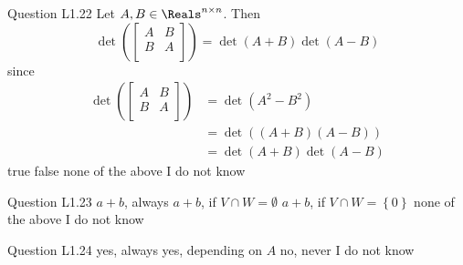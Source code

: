 \begin{frame}{Question L1.22}
	\QuestionNotes{}
	\QuestionBody
	{
		Let $A, B \in \Reals^{n \times n}$. Then
		$$
		\det
		\left( 
			\begin{bmatrix}
				A & B \\
				B & A \\
			\end{bmatrix}
		\right)
		=
		\det \left( A + B \right)
		\det \left( A - B \right)
		$$
		since
		$$
		\begin{array}{ll}
			\det
			\left( 
				\begin{bmatrix}
					A & B \\
					B & A \\
				\end{bmatrix}
			\right)
			& =
			\det
			\left( 
				A^{2} - B^{2}
			\right) \\
			& =
			\det
			\left( 
				(A + B)
				(A - B)
			\right) \\
			& =
			\det \left( A + B \right)
			\det \left( A - B \right)
		\end{array}
		$$
	}
	\QuestionAnswers
	{
		\answer true
		\answer false
		\correctanswer none of the above
		\answer I do not know
	}
\end{frame}


\begin{frame}{Question L1.23}
	\QuestionNotes{}
	\QuestionAnswers
	{
		\answer $a + b$, always
		\answer $a + b$, if $V \cap W = \emptyset$
		\correctanswer $a + b$, if $V \cap W = \left\{ 0 \right\}$
		\answer none of the above
		\answer I do not know
	}
\end{frame}


\begin{frame}{Question L1.24}
	\QuestionNotes{}
	\QuestionAnswers
	{
		\answer yes, always
		\answer yes, depending on $A$
		\correctanswer no, never
		\answer I do not know
	}
\end{frame}


